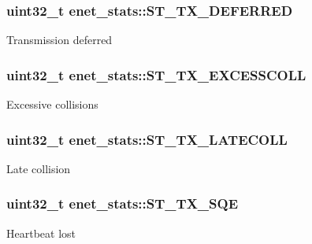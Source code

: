 \subsubsection[{\texorpdfstring{S\+T\+\_\+\+T\+X\+\_\+\+D\+E\+F\+E\+R\+R\+ED}{ST_TX_DEFERRED}}]{\setlength{\rightskip}{0pt plus 5cm}uint32\+\_\+t enet\+\_\+stats\+::\+S\+T\+\_\+\+T\+X\+\_\+\+D\+E\+F\+E\+R\+R\+ED}\hypertarget{structenet__stats_a482b8485a483b18d68215e021eb6971c}{}\label{structenet__stats_a482b8485a483b18d68215e021eb6971c}
Transmission deferred 
\subsubsection[{\texorpdfstring{S\+T\+\_\+\+T\+X\+\_\+\+E\+X\+C\+E\+S\+S\+C\+O\+LL}{ST_TX_EXCESSCOLL}}]{\setlength{\rightskip}{0pt plus 5cm}uint32\+\_\+t enet\+\_\+stats\+::\+S\+T\+\_\+\+T\+X\+\_\+\+E\+X\+C\+E\+S\+S\+C\+O\+LL}\hypertarget{structenet__stats_a1b2da4037cf958d933910e2ca3866adc}{}\label{structenet__stats_a1b2da4037cf958d933910e2ca3866adc}
Excessive collisions 
\subsubsection[{\texorpdfstring{S\+T\+\_\+\+T\+X\+\_\+\+L\+A\+T\+E\+C\+O\+LL}{ST_TX_LATECOLL}}]{\setlength{\rightskip}{0pt plus 5cm}uint32\+\_\+t enet\+\_\+stats\+::\+S\+T\+\_\+\+T\+X\+\_\+\+L\+A\+T\+E\+C\+O\+LL}\hypertarget{structenet__stats_ab54f2d47884902b90b42451f1cfd0e6a}{}\label{structenet__stats_ab54f2d47884902b90b42451f1cfd0e6a}
Late collision 
\subsubsection[{\texorpdfstring{S\+T\+\_\+\+T\+X\+\_\+\+S\+QE}{ST_TX_SQE}}]{\setlength{\rightskip}{0pt plus 5cm}uint32\+\_\+t enet\+\_\+stats\+::\+S\+T\+\_\+\+T\+X\+\_\+\+S\+QE}\hypertarget{structenet__stats_a127011cc7d1952f019381a27d750fde9}{}\label{structenet__stats_a127011cc7d1952f019381a27d750fde9}
Heartbeat lost 
